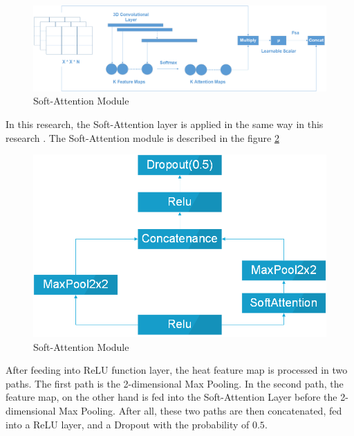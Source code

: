 \documentclass[sensors,article,submit,pdftex,moreauthors]{Definitions/mdpi}
\begin{document}
\begin{figure}[H]
	\centering
	\includegraphics[width=1\linewidth]{Definitions/SoftAttention}
	\caption{Soft-Attention Module}
	\label{fig:soft-attention}
\end{figure}

In this research, the Soft-Attention layer is applied in the same way in this research \cite{03358}. The Soft-Attention module is described in the figure \ref{fig:soft-attention-block}

\begin{figure}[H]
	\centering
	\includegraphics[width=0.5\linewidth]{Definitions/SoftAttentionBlock}
	\caption{Soft-Attention Module}
	\label{fig:soft-attention-block}
\end{figure}

After feeding into ReLU function layer, the heat feature map is processed in two paths. The first path is the 2-dimensional Max Pooling. In the second path, the feature map, on the other hand is fed into the Soft-Attention Layer before the 2-dimensional Max Pooling. After all, these two paths are then concatenated, fed into a ReLU layer, and a Dropout with the probability of $0.5$.
\end{document}
